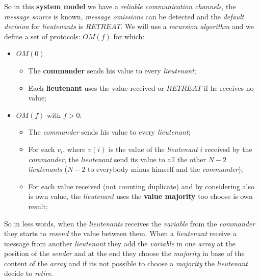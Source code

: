 \documentclass{article}
\begin{document}
So in this \textbf{system model }we have a \emph{reliable communication channels}, the \emph{message source} is known, \emph{message omissions} can be detected and the \emph{default decision} for \emph{lieutenants} is $RETREAT$. We will use a \emph{recursion algorithm} and we define a set of protocols: $OM(f)$ for which:
\begin{itemize}
\item $OM(0)$
\begin{itemize}
\item The \textbf{commander} sends his value to every \emph{lieutenant};
\item Each \textbf{lieutenant} uses the value received or $RETREAT$ if he receives no value;
\end{itemize}
\item $OM(f)$ with $f>0$:
\begin{itemize}
\item The \emph{commander} sends his value to every \emph{lieutenant};
\item For each $v_i$, where $v(i)$ is the value of the \emph{lieutenant} $i$ received by the \emph{commander}, the \emph{lieutenant} send its value to all the other $N-2$ \emph{lieutenants} ($N-2$ to everybody minus himself and the \emph{commander});
\item For each value received (not counting duplicate) and by considering also is own value, the \emph{lieutenant} uses the \textbf{value majority} too choose is own result;
\end{itemize}
\end{itemize}
So in less words, when the \emph{lieutenants} receives the \emph{variable} from the \emph{commander} they starts to \emph{resend} the value between them. When a \emph{lieutenant} receive a message from another \emph{lieutenant} they add the \emph{variable} in one \emph{array} at the position of the \emph{sender} and at the end they choose the \emph{majority} in base of the content of the \emph{array} and if its not possible to choose a \emph{majority} the \emph{lieutenant} decide to \emph{retire}.  
\end{document}
